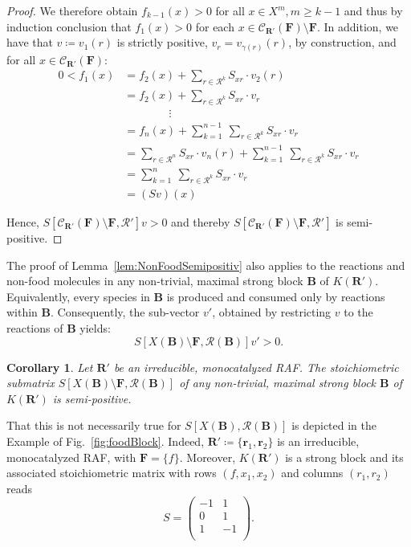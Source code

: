 \documentclass[pdflatex]{sn-jnl}
\theoremstyle{thmstyleone}%
\newtheorem{corollary}[theorem]{Corollary}%
\theoremstyle{examplesty}%
\theoremstyle{thmstylethree}%
\newcommand{\king}{K}
\newcommand{\food}{\ensuremath{\mathbf{F}}}
\newcommand{\SM}{S}
\newcommand{\closure}[2]{\mathscr{C}_{#1}(#2)}
\newcommand{\CR}[0]{\mathcal{R}}
\newcommand{\fr}[0]{\mathbf{r}}
\newcommand{\RAF}[0]{\mathbf{R}'}
\newcommand{\block}[0]{\mathbf{B}}
\begin{document}
{\begin{proof}
    We therefore obtain $f_{k-1}(x)>0$ for all $x\in X^{m}, m\geq k-1$ and thus by induction conclusion that $f_1(x)>0$ for each $x \in \closure{\RAF}{\food}\setminus \food$. In addition, we have that $v\coloneqq v_{1}(r)$ is strictly positive, $v_r=v_{\gamma(r)}(r)$, by construction, and for all $x \in \closure{\RAF}{\food}$:
    \begin{equation}
    	\begin{split}
    		0 < f_1(x) & = f_2(x) + \sum_{r\in \CR^k} \SM_{xr} \cdot v_2(r)  \\[0.5em]
    		 & = f_2(x) + \sum_{r\in \CR^k} \SM_{xr} \cdot v_r  \\[0.5em]
    		 & \qquad \qquad \vdots \\[0.5em]
    		 & =  f_n(x) + \sum_{k=1}^{n-1} \ \sum_{r\in \CR^k} \SM_{xr} \cdot v_r \\[0.5em]
    		 & = \sum_{r\in \CR^n} \SM_{xr} \cdot v_n(r)+ \sum_{k=1}^{n-1} \ \sum_{r\in \CR^k} \SM_{xr} \cdot v_r\\[0.5em] 
    		 & = \sum_{k=1}^{n} \ \sum_{r\in \CR^k} \SM_{xr} \cdot v_r \\[0.5em]
    		 & = (Sv)(x) 	
    	\end{split}
    \end{equation}
    
    Hence, $\SM[\closure{\RAF}{\food}\setminus \food, \CR']v>0$ and thereby $\SM[\closure{\RAF}{\food}\setminus \food, \CR']$ is semi-positive.
\end{proof}

The proof of Lemma~\ref{lem:NonFoodSemipositiv} also applies to the reactions and non-food molecules in any non-trivial, maximal strong block $\block$ of $\king(\RAF)$. Equivalently, every species in $\block$ is produced and consumed only by reactions within $\block$. Consequently, the sub-vector $v'$, obtained by restricting $v$ to the reactions of $\block$ yields:
\begin{equation}
  \SM[X(\block)\setminus \food, \CR(\block)]v'>0.
\end{equation}
\begin{corollary}\label{cor:blockSemiPositiv}
	Let $\RAF$ be an irreducible, monocatalyzed RAF. The stoichiometric submatrix $\SM[X(\block)\setminus \food, \CR(\block)]$ of any non-trivial, maximal strong block $\block$ 
	of $\king(\RAF)$ is semi-positive.
\end{corollary}
\vspace{6pt}

That this is not necessarily true for $\SM[X(\block), \CR(\block)]$ is depicted in the Example of Fig.~\ref{fig:foodBlock}. Indeed, $\RAF\coloneqq \{\fr_1,\fr_2\}$ is an irreducible, monocatalyzed RAF, with $\food=\{f\}$. Moreover, $\king(\RAF)$ is a strong block and its associated stoichiometric matrix with rows $(f, x_1, x_2)$ and columns $(r_1, r_2)$ reads
\begin{equation}
	\SM=\begin{pmatrix}
		-1 & 1 \\
		0 & 1 \\
		1 & -1 \\
	\end{pmatrix}.
\end{equation}

}
\end{document}
